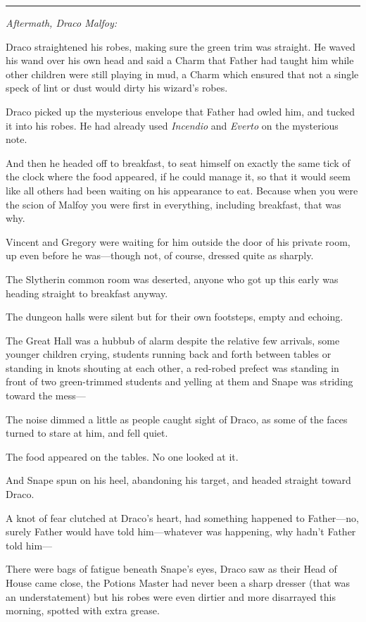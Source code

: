 \begin{center}\rule{3in}{0.4pt}\end{center}

\emph{Aftermath, Draco Malfoy:}

Draco straightened his robes, making sure the green trim was straight.
He waved his wand over his own head and said a Charm that Father had
taught him while other children were still playing in mud, a Charm which
ensured that not a single speck of lint or dust would dirty his wizard's
robes.

Draco picked up the mysterious envelope that Father had owled him, and
tucked it into his robes. He had already used \emph{Incendio} and
\emph{Everto} on the mysterious note.

And then he headed off to breakfast, to seat himself on exactly the same
tick of the clock where the food appeared, if he could manage it, so
that it would seem like all others had been waiting on his appearance to
eat. Because when you were the scion of Malfoy you were first in
everything, including breakfast, that was why.

Vincent and Gregory were waiting for him outside the door of his private
room, up even before he was---though not, of course, dressed quite as
sharply.

The Slytherin common room was deserted, anyone who got up this early was
heading straight to breakfast anyway.

The dungeon halls were silent but for their own footsteps, empty and
echoing.

The Great Hall was a hubbub of alarm despite the relative few arrivals,
some younger children crying, students running back and forth between
tables or standing in knots shouting at each other, a red-robed prefect
was standing in front of two green-trimmed students and yelling at them
and Snape was striding toward the mess---

The noise dimmed a little as people caught sight of Draco, as some of
the faces turned to stare at him, and fell quiet.

The food appeared on the tables. No one looked at it.

And Snape spun on his heel, abandoning his target, and headed straight
toward Draco.

A knot of fear clutched at Draco's heart, had something happened to
Father---no, surely Father would have told him---whatever was happening,
why hadn't Father told him---

There were bags of fatigue beneath Snape's eyes, Draco saw as their Head
of House came close, the Potions Master had never been a sharp dresser
(that was an understatement) but his robes were even dirtier and more
disarrayed this morning, spotted with extra grease.


